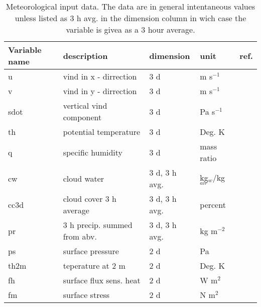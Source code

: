 \begin{table} [h]
\begin{center}
\caption{Meteorological input data. The data are in general intentaneous 
values unless listed as 3 h avg. in the dimension column in wich case the 
variable is givea as a 3 hour average.}
\label {table:variable_inmet}
\begin{tabular} {l|l|l|l|l}
Variable name & description             &dimension& unit       & ref.   \\
\hline
u             & vind in x - dirrection  & 3 d   & m s$^{-1}$   &        \\
v             & vind in y - dirrection  & 3 d   & m s$^{-1}$   &        \\
sdot          & vertical vind component & 3 d   & Pa s$^{-1}$  &        \\
th            & potential temperature   & 3 d   & Deg. K       &        \\
q             & specific humidity       &3 d    & mass ratio &        \\
cw            & cloud water            & 3 d, 3 h avg.& kg$_w$/kg$_{air}$  & \\
cc3d          & cloud cover 3 h average & 3 d, 3 h avg.& percent   &        \\
pr            & 3 h precip. summed from abv.& 3 d, 3 h avg. & kg m$^{-2}$ &  \\
ps            & surface pressure        & 2 d   & Pa           &        \\
th2m          & teperature at 2 m       & 2 d   & Deg. K       &        \\
fh            & surface flux sens. heat & 2 d   & W m$^2$      &        \\
fm            & surface stress          & 2 d   & N m$^2$      &        \\ 

\end {tabular}
\end {center}
\end {table}


